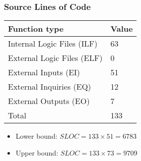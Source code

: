 \begin{frame}
	\frametitle{Source Lines of Code}
	\begin{table}[H]
		\centering
		\begin{tabular}{|l|l|}
			\hline
			Function type & Value \\
			\hline
			Internal Logic Files (ILF) & 63 \\
			External Logic Files (ELF) & 0 \\
			External Inputs (EI) & 51 \\
			External Inquiries (EQ) & 12 \\
			External Outputs (EO) & 7 \\
			\hline
			Total & 133 \\
			\hline
		\end{tabular}
	\end{table}
	\begin{itemize}
		\centering
		\item Lower bound: \(SLOC = 133 \times 51 = 6783\)
		\item Upper bound: \(SLOC = 133 \times 73 = 9709\)
	\end{itemize}
\end{frame}


